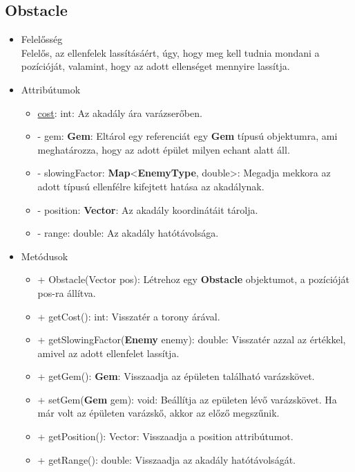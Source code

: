 \subsection{Obstacle}
\begin{itemize}
\item Felelősség\\
Felelős, az ellenfelek lassításáért, úgy, hogy meg kell tudnia mondani a pozícióját, valamint, hogy az adott ellenséget mennyire lassítja.
\item Attribútumok
	\begin{itemize}
		\item \underline{cost}: int: Az akadály ára varázserőben.
		\item - gem: \textbf{Gem}: Eltárol egy referenciát egy \textbf{Gem} típusú objektumra, ami meghatározza, hogy az adott épület milyen echant alatt áll.
		\item - slowingFactor: \textbf{Map}<\textbf{EnemyType}, double>: Megadja mekkora az adott típusú ellenfélre kifejtett hatása az akadálynak.
		\item - position: \textbf{Vector}: Az akadály koordinátáit tárolja.
		\item - range: double: Az akadály hatótávolsága.
	\end{itemize}
\item Metódusok
	\begin{itemize}
		\item + Obstacle(Vector pos): Létrehoz egy \textbf{Obstacle} objektumot, a pozícióját pos-ra állítva.
		\item + getCost(): int: Visszatér a torony árával.
		\item + getSlowingFactor(\textbf{Enemy} enemy): double: Visszatér azzal az értékkel, amivel az adott ellenfelet lassítja.
		\item + getGem(): \textbf{Gem}: Visszaadja az épületen található varázskövet.
		\item + setGem(\textbf{Gem} gem): void: Beállítja az epületen lévő varázskövet. Ha már volt az épületen varázskő, akkor az előző megszűnik.
		\item + getPosition(): Vector: Visszaadja a position attribútumot.
		\item + getRange(): double: Visszaadja az akadály hatótávolságát.
	\end{itemize}
\end{itemize}


